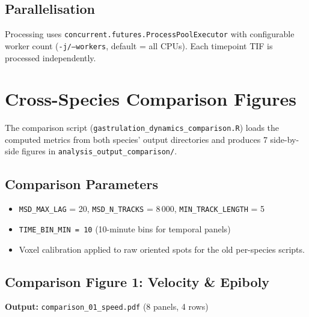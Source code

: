 \documentclass[11pt,a4paper]{article}
\newcommand{\param}[1]{\texttt{#1}}
\begin{document}
\subsection*{Parallelisation}

Processing uses \texttt{concurrent.futures.ProcessPoolExecutor} with
configurable worker count (\texttt{-j/--workers}, default = all CPUs).
Each timepoint TIF is processed independently.


\newpage
\section*{Cross-Species Comparison Figures}
\label{sec:comparison}

The comparison script (\texttt{gastrulation\_dynamics\_comparison.R}) loads
the computed metrics from both species' output directories and produces 7
side-by-side figures in \texttt{analysis\_output\_comparison/}.

\subsection*{Comparison Parameters}

\begin{itemize}[nosep]
  \item \param{MSD\_MAX\_LAG} = 20, \param{MSD\_N\_TRACKS} = 8\,000,
        \param{MIN\_TRACK\_LENGTH} = 5
  \item \texttt{TIME\_BIN\_MIN = 10} (10-minute bins for temporal panels)
  \item Voxel calibration applied to raw oriented spots for the old
        per-species scripts.
\end{itemize}


\subsection*{Comparison Figure 1: Velocity \& Epiboly}

\noindent\textbf{Output:} \texttt{comparison\_01\_speed.pdf}
(8 panels, 4 rows)
\end{document}
